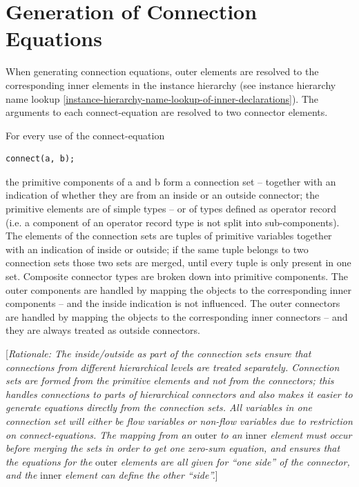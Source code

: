 \documentclass[10pt,a4paper]{report}
\def\doublelabel#1{\label{#1}\hypertarget{#1}{}}
\begin{document}
\section{Generation of Connection Equations}\doublelabel{generation-of-connection-equations}

When generating connection equations, outer elements are resolved to the
corresponding inner elements in the instance hierarchy (see instance
hierarchy name lookup \ref{instance-hierarchy-name-lookup-of-inner-declarations}). The arguments to each connect-equation are
resolved to two connector elements.

For every use of the connect-equation
\begin{lstlisting}[language=modelica]
connect(a, b);
\end{lstlisting}

the primitive components of a and b form a connection set -- together
with an indication of whether they are from an inside or an outside
connector; the primitive elements are of simple types -- or of types
defined as operator record (i.e. a component of an operator record type
is not split into sub-components). The elements of the connection sets
are tuples of primitive variables together with an indication of inside
or outside; if the same tuple belongs to two connection sets those two
sets are merged, until every tuple is only present in one set. Composite
connector types are broken down into primitive components. The outer
components are handled by mapping the objects to the corresponding inner
components -- and the inside indication is not influenced. The outer
connectors are handled by mapping the objects to the corresponding inner
connectors -- and they are always treated as outside connectors.

{[}\emph{Rationale: The inside/outside as part of the connection sets
ensure that connections from different hierarchical levels are treated
separately. Connection sets are formed from the primitive elements and
not from the connectors; this handles connections to parts of
hierarchical connectors and also makes it easier to generate equations
directly from the connection sets. All variables in one connection set
will either be flow variables or non-flow variables due to restriction
on connect-equations. The mapping from an} outer \emph{to an} inner
\emph{element must occur before merging the sets in order to get one
zero-sum equation, and ensures that the equations for the} outer
\emph{elements are all given for ``one side'' of the connector, and the}
inner \emph{element can define the other ``side''.}{]}
\end{document}
